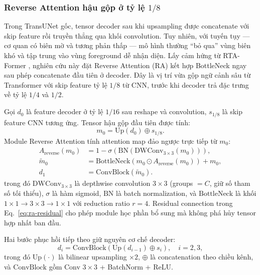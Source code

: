 \documentclass[10pt,a4paper]{article}
\begin{document}
\subsubsection{Reverse Attention hậu gộp ở tỷ lệ $1/8$}

Trong TransUNet gốc, tensor decoder sau khi upsampling được concatenate với skip feature rồi truyền thẳng qua khối convolution. Tuy nhiên, với tuyến tụy --- cơ quan có biên mờ và tương phản thấp --- mô hình thường ``bỏ qua'' vùng biên khó và tập trung vào vùng foreground dễ nhận diện. Lấy cảm hứng từ RTA-Former \cite{li2024rtaformer}, nghiên cứu này đặt Reverse Attention (RA) kết hợp BottleNeck ngay sau phép concatenate đầu tiên ở decoder. Đây là vị trí vừa gộp ngữ cảnh sâu từ Transformer với skip feature tỷ lệ $1/8$ từ CNN, trước khi decoder trả đặc trưng về tỷ lệ $1/4$ và $1/2$.

Gọi $d_0$ là feature decoder ở tỷ lệ $1/16$ sau reshape và convolution, $s_{1/8}$ là skip feature CNN tương ứng. Tensor hậu gộp đầu tiên được tính:
\begin{equation}
    m_0 = \text{Up}(d_0) \oplus s_{1/8}.
    \label{eq:first-decoder-merge}
\end{equation}
Module Reverse Attention tính attention map đảo ngược trực tiếp từ $m_0$:
\begin{align}
    A_{\text{reverse}}(m_0) &= 1 - \sigma\left(\text{BN}\left(\text{DWConv}_{3\times3}(m_0)\right)\right), \label{eq:reverse-map}\\
    \widetilde{m}_0 &= \text{BottleNeck}\left(m_0 \odot A_{\text{reverse}}(m_0)\right) + m_0, \label{eq:ra-residual}\\
    d_1 &= \text{ConvBlock}\left(\widetilde{m}_0\right). \label{eq:decoder-ra}
\end{align}
trong đó $\text{DWConv}_{3\times3}$ là depthwise convolution $3\times3$ (groups $= C$, giữ số tham số tối thiểu), $\sigma$ là hàm sigmoid, $\text{BN}$ là batch normalization, và $\text{BottleNeck}$ là khối $1\times1 \rightarrow 3\times3 \rightarrow 1\times1$ với reduction ratio $r=4$. Residual connection trong Eq.~\ref{eq:ra-residual} cho phép module học phần bổ sung mà không phá hủy tensor hợp nhất ban đầu.

Hai bước phục hồi tiếp theo giữ nguyên cơ chế decoder:
\begin{equation}
    d_i = \text{ConvBlock}\left(\text{Up}(d_{i-1}) \oplus s_i\right), \quad i = 2, 3,
    \label{eq:decoder-follow-up}
\end{equation}
trong đó $\text{Up}(\cdot)$ là bilinear upsampling $\times 2$, $\oplus$ là concatenation theo chiều kênh, và $\text{ConvBlock}$ gồm Conv $3\times3$ + BatchNorm + ReLU.
\end{document}
